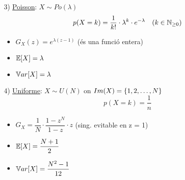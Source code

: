 \vspace{0.5cm}

3) \underline{Poisson}: $X \sim Po(\lambda)$
\[
  p(X=k) = \frac{1}{k!}\cdot \lambda^{k}\cdot e^{-\lambda} \quad (k\in \mathbb{N}_{\geq 0})
\]
\begin{itemize}
    \item $G_{X}(z) = e^{\lambda(z-1)}$ \quad (és una funció entera)
    \item $\mathbb{E}[X] = \lambda$
    \item $\mathbb{V} ar[X] = \lambda$
\end{itemize}

\vspace{0.5cm}

4) \underline{Uniforme}: $X\sim U(N)$ on $Im(X) = \left\{1,2,\ldots, N\right\}$ \\
\[
  p(X=k) = \frac{1}{n}
\]
\begin{itemize}
    \item $G_{X} = \dfrac{1}{N}\cdot \dfrac{1-z^{N}}{1-z}\cdot z$ \quad (sing. evitable en z = 1)
    \item $\mathbb{E}[X]=\dfrac{N+1}{2}$
    \item $\mathbb{V} ar[X] = \dfrac{N^{2}-1}{12}$
\end{itemize}
